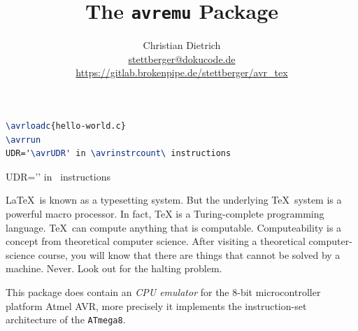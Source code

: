 \documentclass{article}
\title{The \texttt{avremu} Package}
\author{Christian Dietrich\\
\url{stettberger@dokucode.de}\\
\url{https://gitlab.brokenpipe.de/stettberger/avr_tex}}
\begin{document}
\maketitle

\begin{tcolorbox}
  
  \tcblower
  \begin{lstlisting}[language=TeX]
\avrloadc{hello-world.c}
\avrrun
UDR='\avrUDR' in \avrinstrcount\ instructions
\end{lstlisting}
\end{tcolorbox}
\begin{tcolorbox}
\avrrun
UDR='\avrUDR' in \avrinstrcount\ instructions
\end{tcolorbox}


\LaTeX\ is known as a typesetting system. But the underlying \TeX\ system is a powerful macro
processor. In fact, TeX is a Turing-complete programming language. \TeX\ can compute anything that
is computable. Computeability is a concept from theoretical computer science. After visiting a
theoretical computer-science course, you will know that there are things that cannot be solved by a
machine. Never. Look out for the halting problem. 

This package does contain an \emph{CPU emulator} for the 8-bit microcontroller platform Atmel AVR, more
precisely it implements the instruction-set architecture of the \texttt{ATmega8}.
\end{document}
